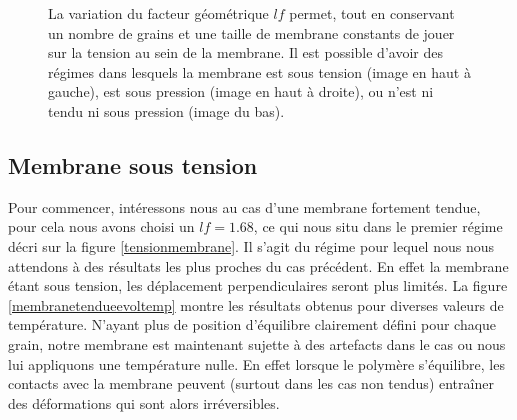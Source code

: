 \begin{figure}[H]
\begin{center}
\begin{minipage}{0.5\linewidth}
\end{minipage}
\begin{minipage}{0.49\linewidth}
\caption[Tension au sein de la membrane]{La variation du facteur géométrique $lf$ permet, tout en conservant un nombre de grains et une taille de membrane constants de jouer sur la tension au sein de la membrane. Il est possible d'avoir des régimes dans lesquels la membrane est sous tension (image en haut à gauche), est sous pression (image en haut à droite), ou n'est ni tendu ni sous pression (image du bas).}
\label{snapshottensionmembranesnapshot}
\end{minipage}

\end{center}
\end{figure}



\newpage

\subsection{Membrane sous tension}

Pour commencer, intéressons nous au cas d'une membrane fortement tendue, pour cela nous avons choisi un $lf=1.68$, ce qui nous situ dans le premier régime décri sur la figure \ref{tensionmembrane}. Il s'agit du régime pour lequel nous nous attendons à des résultats les plus proches du cas précédent. En effet la membrane étant sous tension, les déplacement perpendiculaires seront plus limités. La figure \ref{membranetendueevoltemp} montre les résultats obtenus pour diverses valeurs de température. N'ayant plus de position d'équilibre clairement défini pour chaque grain, notre membrane est maintenant sujette à des artefacts dans le cas ou nous lui appliquons une température nulle. En effet lorsque le polymère s'équilibre, les contacts avec la membrane peuvent (surtout dans les cas non tendus) entraîner des déformations qui sont alors irréversibles.



